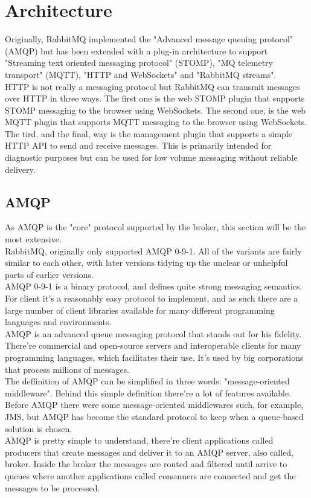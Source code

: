\documentclass[12pt]{article}
\begin{document}
\section*{Architecture}
Originally, RabbitMQ implemented the "Advanced message queuing protocol" (AMQP) but has been extended with a plug-in architecture to support "Streaming text oriented messaging protocol" (STOMP), "MQ telemetry transport" (MQTT), "HTTP and WebSockets" and "RabbitMQ streams".\\
HTTP is not really a messaging protocol but RabbitMQ can transmit messages over HTTP in three ways. The first one is the web STOMP plugin that supports STOMP messaging to the browser using WebSockets. The second one, is the web MQTT plugin that supports MQTT messaging to the browser using WebSockets. The tird, and the final, way is the management plugin that supports a simple HTTP API to send and receive messages. This is primarily intended for diagnostic purposes but can be used for low volume messaging without reliable delivery.
\newpage
\subsection*{AMQP}
As AMQP is the "core" protocol supported by the broker, this section will be the most extensive.\\
RabbitMQ, originally only supported AMQP 0-9-1. All of the variants are fairly similar to each other, with later versions tidying up the unclear or unhelpful parts of earlier versions.\\
AMQP 0-9-1 is a binary protocol, and defines quite strong messaging semantics. For client it's a reasonably easy protocol to implement, and as such there are a large number of client libraries available for many different programming languages and environments.\\
AMQP is an advanced queue messaging protocol that stands out for his fidelity. There're commercial and open-source servers and interoperable clients for many programming languages, which facilitates  their use. It's used by big corporations that process millions of messages.\\
The deffinition of AMQP can be simplified in three words: "message-oriented middleware". Behind this simple definition there're a lot of features available. Before AMQP there were some message-oriented middlewares such, for example, JMS, but AMQP has become the standard protocol to keep when a queue-based solution is chosen.\\
AMQP is pretty simple to understand, there're client applications called producers that create messages and deliver it to an AMQP server, also called, broker. Inside the broker the messages are routed and filtered until arrive to queues where another applications called consumers are connected and get the messages to be processed.
\end{document}
